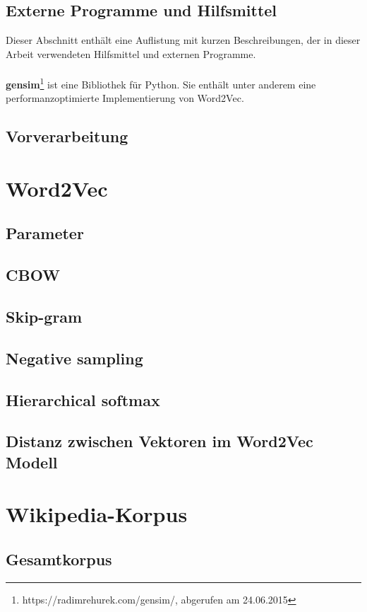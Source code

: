 \documentclass[12pt,a4paper]{report}
\begin{document}
	\section{Externe Programme und Hilfsmittel}
	Dieser Abschnitt enthält eine Auflistung mit kurzen Beschreibungen, der in dieser Arbeit verwendeten Hilfsmittel und externen Programme.\\
	\vspace{1em}\\	
	\textbf{gensim}\cite{}\footnote{https://radimrehurek.com/gensim/, abgerufen am 24.06.2015} ist eine Bibliothek für Python. Sie enthält unter anderem eine performanzoptimierte Implementierung von Word2Vec. 
	\vspace{1em}\\
	\section{Vorverarbeitung}
\newpage
\chapter{Word2Vec}
	\section{Parameter}
	\section{CBOW}
	\section{Skip-gram}
	\section{Negative sampling}
	\section{Hierarchical softmax}
	\section{Distanz zwischen Vektoren im Word2Vec Modell}
\newpage
\chapter{Wikipedia-Korpus}
	\section{Gesamtkorpus}
	\label{sec:Gesamtkorpus}
\end{document}
